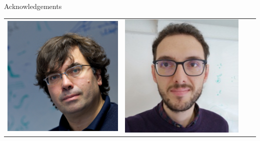 \documentclass[xcolor=table,aspectratio=169]{beamer}
\numberwithin{equation}{section}
\begin{document}
\begin{frame}{Acknowledgements}
   \begin{center}
      \footnotesize
      \begin{tabularx}{\textwidth}{CCCC}
         \includegraphics[height = 0.3\paperheight]{figures/nicola_marzari.jpg}     &
         \includegraphics[height = 0.3\paperheight]{figures/nicola_colonna2.png}    &

\end{tabularx}
\end{center}
\end{frame}
\end{document}
